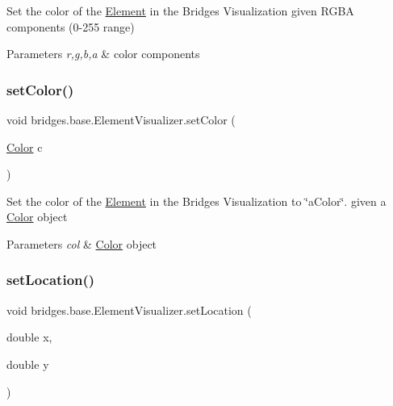 Set the color of the \mbox{\hyperlink{classbridges_1_1base_1_1_element}{Element}} in the Bridges Visualization given R\+G\+BA components (0-\/255 range)


\begin{DoxyParams}{Parameters}
{\em r,g,b,a} & color components \\
\hline
\end{DoxyParams}
\mbox{\label{classbridges_1_1base_1_1_element_visualizer_a33172ab908f3b6f9740727b0bfe91565}} 
\subsubsection{\texorpdfstring{setColor()}{setColor()}\hspace{0.1cm}{\footnotesize\ttfamily [3/3]}}
{\footnotesize\ttfamily void bridges.\+base.\+Element\+Visualizer.\+set\+Color (\begin{DoxyParamCaption}\item[{\mbox{\hyperlink{classbridges_1_1base_1_1_color}{Color}}}]{c }\end{DoxyParamCaption})}

Set the color of the \mbox{\hyperlink{classbridges_1_1base_1_1_element}{Element}} in the Bridges Visualization to \char`\"{}a\+Color\char`\"{}. given a \mbox{\hyperlink{classbridges_1_1base_1_1_color}{Color}} object


\begin{DoxyParams}{Parameters}
{\em col} & \mbox{\hyperlink{classbridges_1_1base_1_1_color}{Color}} object \\
\hline
\end{DoxyParams}
\mbox{\label{classbridges_1_1base_1_1_element_visualizer_a04f3416447f2042de7cd21ce5b6a0598}} 
\subsubsection{\texorpdfstring{setLocation()}{setLocation()}}
{\footnotesize\ttfamily void bridges.\+base.\+Element\+Visualizer.\+set\+Location (\begin{DoxyParamCaption}\item[{double}]{x,  }\item[{double}]{y }\end{DoxyParamCaption})}

